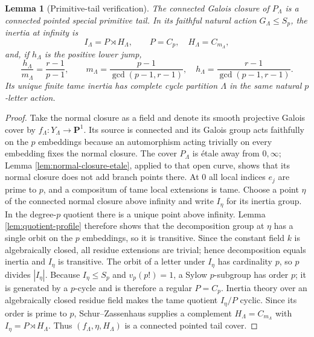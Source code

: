 \documentclass[11pt]{amsart}
\theoremstyle{plain}
\newtheorem{lemma}[theorem]{Lemma}
\theoremstyle{definition}
\numberwithin{equation}{section}
\begin{document}
\begin{lemma}[Primitive-tail verification]\label{lem:primitive-tail}
The connected Galois closure of $P_\Lambda$ is a connected pointed special
primitive tail.  In its faithful natural action $G_\Lambda\leq S_p$, the
inertia at infinity is
\[
 I_\Lambda=P\rtimes H_\Lambda,\qquad
 P=C_p,\quad H_\Lambda=C_{m_\Lambda},
 \label{eq:primitive-inertia}
\]
and, if $h_\Lambda$ is the positive lower jump,
\[
 \frac{h_\Lambda}{m_\Lambda}
 =\frac{r-1}{p-1},\qquad
 m_\Lambda=\frac{p-1}{\gcd(p-1,r-1)},\quad
 h_\Lambda=\frac{r-1}{\gcd(p-1,r-1)}.
 \label{eq:primitive-type}
\]
Its unique finite tame inertia has complete cycle partition $\Lambda$ in
the same natural $p$-letter action.
\end{lemma}

\begin{proof}
Take the normal closure as a field and denote its smooth projective Galois
cover by $f_\Lambda:Y_\Lambda\to\mathbf P^1$.  Its source is connected and
its Galois group acts faithfully on the $p$ embeddings because an
automorphism acting trivially on every embedding fixes the normal closure.
The cover $P_\Lambda$ is étale away from $0,\infty$; Lemma
\ref{lem:normal-closure-etale}, applied to that open curve, shows that its
normal closure does not add branch points there.  At $0$ all local indices
$e_j$ are prime to $p$, and a compositum of tame local extensions is tame.
Choose a point $\eta$ of the connected normal closure above infinity and
write $I_\eta$ for its inertia group.  In the degree-$p$ quotient there is a
unique point above infinity.  Lemma \ref{lem:quotient-profile} therefore
shows that the decomposition group at $\eta$ has a single orbit on the $p$
embeddings, so it is transitive.  Since the
constant field $k$ is algebraically closed, all residue extensions are
trivial; hence decomposition equals inertia and $I_\eta$ is transitive.
The orbit of a letter under $I_\eta$ has cardinality $p$, so $p$ divides
$|I_\eta|$.  Because $I_\eta\leq S_p$ and $v_p(p!)=1$, a Sylow
$p$-subgroup has order $p$; it is generated by a $p$-cycle and is therefore
a regular $P=C_p$.  Inertia theory over an algebraically closed residue
field makes the tame quotient $I_\eta/P$ cyclic.  Since its order is prime
to $p$, Schur--Zassenhaus supplies a complement
$H_\Lambda=C_{m_\Lambda}$ with
$I_\eta=P\rtimes H_\Lambda$.  Thus
$(f_\Lambda,\eta,H_\Lambda)$ is a connected pointed tail cover.


\end{proof}
\end{document}
